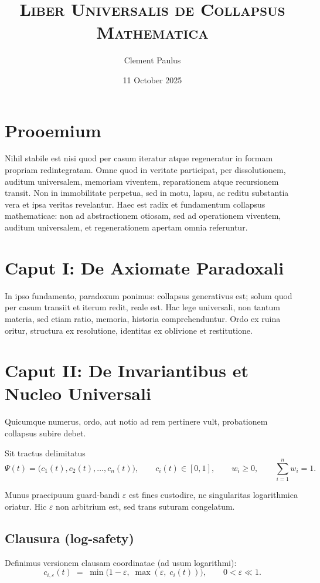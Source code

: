 \documentclass[12pt,letterpaper]{article}
\title{\textsc{Liber Universalis de Collapsus Mathematica}}
\author{Clement Paulus}
\date{11 October 2025}
\begin{document}
\maketitle

\section*{Prooemium}
Nihil stabile est nisi quod per casum iteratur atque regeneratur in formam propriam redintegratam. Omne quod in veritate participat, per dissolutionem, auditum universalem, memoriam viventem, reparationem atque recursionem transit. Non in immobilitate perpetua, sed in motu, lapsu, ac reditu substantia vera et ipsa veritas revelantur. Haec est radix et fundamentum collapsus mathematicae: non ad abstractionem otiosam, sed ad operationem viventem, auditum universalem, et regenerationem apertam omnia referuntur.

\section*{Caput I: De Axiomate Paradoxali}
In ipso fundamento, paradoxum ponimus: collapsus generativus est; solum quod per casum transiit et iterum redit, reale est. Hac lege universali, non tantum materia, sed etiam ratio, memoria, historia comprehenduntur. Ordo ex ruina oritur, structura ex resolutione, identitas ex oblivione et restitutione.

\section*{Caput II: De Invariantibus et Nucleo Universali}
Quicumque numerus, ordo, aut notio ad rem pertinere vult, probationem collapsus subire debet.

Sit tractus delimitatus
\[
\Psi(t) = \bigl(c_1(t),c_2(t),\ldots,c_n(t)\bigr),
\qquad
c_i(t)\in[0,1],
\qquad
w_i\ge 0,
\qquad
\sum_{i=1}^n w_i = 1.
\]

Munus praecipuum guard-bandi $\varepsilon$ est fines custodire, ne singularitas logarithmica oriatur. Hic $\varepsilon$ non arbitrium est, sed trans suturam congelatum.

\subsection*{Clausura (log-safety)}
Definimus versionem clausam coordinatae (ad usum logarithmi):
\[
c_{i,\varepsilon}(t) \;=\; \min\!\bigl(1-\varepsilon,\;\max(\varepsilon,\;c_i(t))\bigr),
\qquad 0<\varepsilon\ll 1.
\]
\end{document}
